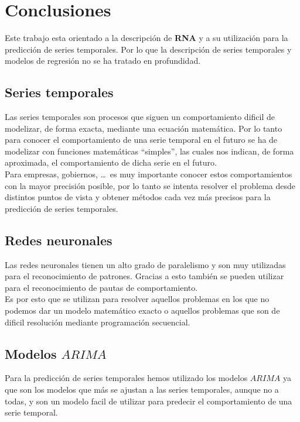 %
%

\chapter{Conclusiones}

Este trabajo esta orientado a la descripci\'on de \textbf{RNA} y a su
utilizaci\'on para la predicci\'on de series temporales. Por lo que la
descripci\'on de series temporales y modelos de regresi\'on no se ha tratado
en profundidad.

\section{Series temporales}

Las series temporales son procesos que siguen un comportamiento dificil de 
modelizar, de forma exacta, mediante una ecuaci\'on matem\'atica. Por lo tanto
para conocer el comportamiento de una serie temporal en el futuro se ha de
modelizar con funciones matem\'aticas ``simples'', las cuales nos indican, de
forma aproximada, el comportamiento de dicha serie en el futuro.\\

Para empresas, gobiernos, \dots\ es muy importante conocer estos comportamientos
con la mayor precisi\'on posible, por lo tanto se intenta resolver el problema
desde distintos puntos de vista y obtener m\'etodos cada vez m\'as precisos para
la predicci\'on de series temporales.

\section{Redes neuronales}

Las redes neuronales tienen un alto grado de paralelismo y son muy utilizadas 
para el reconocimiento de patrones. Gracias a esto tambi\'en se pueden utilizar
para el reconocimiento de pautas de comportamiento.\\

Es por esto que se utilizan para resolver aquellos problemas en los que no
podemos dar un modelo matem\'atico exacto o aquellos problemas que son de 
dificil resoluci\'on mediante programaci\'on secuencial.

\section{Modelos $ARIMA$}

Para la predicci\'on de series temporales hemos utilizado los modelos $ARIMA$ ya
que son los modelos que m\'as se ajustan a las series temporales, aunque no a
todas, y son un modelo facil de utilizar para predecir el comportamiento de una
serie temporal.\\

